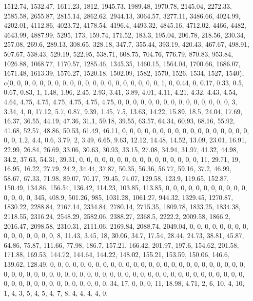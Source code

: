 \documentclass[
]{article}
\begin{document}
1512.74, 1532.47, 1611.23, 1812, 1945.73, 1989.48, 1970.78, 2145.04,
2272.33, 2585.58, 2655.87, 2815.14, 2862.62, 2944.13, 3064.57, 3277.11,
3486.66, 4024.99, 4202.01, 4112.86, 4023.72, 4178.54, 4196.4, 4493.32,
4845.16, 4712.02, 4466, 4482, 4643.99, 4887.99, 5295, 173, 159.74,
171.52, 183.3, 195.04, 206.78, 218.56, 230.34, 257.08, 269.6, 289.13,
308.65, 328.18, 347.7, 355.44, 393.19, 420.43, 467.67, 498.91, 507.67,
538.43, 529.19, 522.95, 538.71, 608.75, 704.76, 776.79, 870.83, 953.84,
1026.88, 1068.77, 1170.57, 1285.46, 1345.35, 1460.15, 1564.04, 1700.66,
1686.07, 1671.48, 1613.39, 1576.27, 1520.18, 1502.09, 1582, 1570, 1526,
1534, 1527, 1540), c(0, 0, 0, 0, 0, 0, 0, 0, 0, 0, 0, 0, 0, 0, 0, 0, 0,
0, 0, 0, 1, 0, 0.44, 0, 0.17, 0.33, 0.5, 0.67, 0.83, 1, 1.48, 1.96,
2.45, 2.93, 3.41, 3.89, 4.01, 4.11, 4.21, 4.32, 4.43, 4.54, 4.64, 4.75,
4.75, 4.75, 4.75, 4.75, 4.75, 0, 0, 0, 0, 0, 0, 0, 0, 0, 0, 0, 0, 0, 0,
0, 3, 3.34, 4, 0, 17.12, 5.7, 0.87, 9.39, 1.45, 7.5, 13.63, 14.22,
15.89, 18.5, 24.04, 17.69, 16.37, 36.55, 44.19, 47.36, 31.1, 59.18,
39.55, 63.57, 64.34, 60.93, 68.16, 55.92, 41.68, 52.57, 48.86, 50.53,
61.49, 46.11, 0, 0, 0, 0, 0, 0, 0, 0, 0, 0, 0, 0, 0, 0, 0, 0, 0, 0, 0,
1.2, 4.4, 0.6, 3.79, 2, 3.49, 6.65, 9.63, 12.12, 14.48, 14.52, 13.09,
23.01, 16.91, 22.99, 26.84, 26.69, 33.06, 30.63, 30.93, 33.15, 27.08,
34.94, 31.97, 41.32, 44.98, 34.2, 37.63, 54.31, 39.31, 0, 0, 0, 0, 0, 0,
0, 0, 0, 0, 0, 0, 0, 0, 0, 0, 11, 29.71, 19, 16.95, 16.22, 27.79, 24.2,
34.44, 37.87, 50.35, 56.36, 56.77, 59.16, 37.2, 46.99, 58.67, 67.33,
71.98, 89.07, 70.17, 79.45, 74.07, 129.58, 123.9, 119.65, 152.87,
150.49, 134.86, 156.54, 136.42, 114.23, 103.85, 113.85, 0, 0, 0, 0, 0,
0, 0, 0, 0, 0, 0, 0, 0, 0, 0, 345, 408.9, 501.26, 985, 1031.28, 1061.27,
944.32, 1329.45, 1270.87, 1830.22, 2288.84, 2167.14, 2334.84, 2780.14,
2715.35, 1809.78, 1833.25, 1834.38, 2118.55, 2316.24, 2548.29, 2582.06,
2388.27, 2368.5, 2222.2, 2009.58, 1866.2, 2016.47, 2098.58, 2310.31,
2111.06, 2169.84, 2088.74, 2049.04, 0, 0, 0, 0, 0, 0, 0, 0, 0, 0, 0, 0,
0, 0, 0, 8, 11.43, 3.45, 18, 30.06, 34.7, 17.54, 28.44, 24.73, 38.81,
45.87, 64.86, 75.87, 111.66, 77.98, 186.7, 157.21, 166.42, 201.97,
197.6, 154.62, 201.58, 171.88, 169.53, 144.72, 144.64, 144.22, 148.02,
155.21, 153.59, 150.06, 146.6, 139.62, 128.49, 0, 0, 0, 0, 0, 0, 0, 0,
0, 0, 0, 0, 0, 0, 0, 0, 0, 0, 0, 0, 0, 0, 0, 0, 0, 0, 0, 0, 0, 0, 0, 0,
0, 0, 0, 0, 0, 0, 0, 0, 0, 0, 0, 0, 0, 0, 0, 0, 0, 0, 0, 0, 0, 0, 0, 0,
0, 0, 0, 0, 0, 0, 0, 0, 0, 0, 0, 0, 0, 0, 0, 0, 34, 17, 0, 0, 0, 11,
18.98, 4.71, 2, 6, 10, 4, 10, 1, 4, 3, 5, 4, 5, 4, 7, 8, 4, 4, 4, 4, 0,
\end{document}
